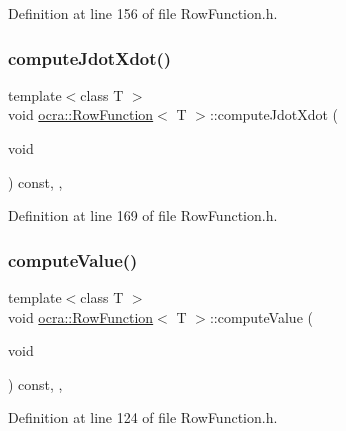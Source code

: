 Definition at line 156 of file Row\+Function.\+h.

\hypertarget{classocra_1_1RowFunction_a6e6009f89040ce403c6b1463dc82b29d}{}\label{classocra_1_1RowFunction_a6e6009f89040ce403c6b1463dc82b29d} 
\subsubsection{\texorpdfstring{compute\+Jdot\+Xdot()}{computeJdotXdot()}}
{\footnotesize\ttfamily template$<$class T $>$ \\
void \hyperlink{classocra_1_1RowFunction}{ocra\+::\+Row\+Function}$<$ T $>$\+::compute\+Jdot\+Xdot (\begin{DoxyParamCaption}\item[{void}]{ }\end{DoxyParamCaption}) const\hspace{0.3cm}{\ttfamily [inline]}, {\ttfamily [protected]}, {\ttfamily [virtual]}}



Definition at line 169 of file Row\+Function.\+h.

\hypertarget{classocra_1_1RowFunction_a99dfb80d85d71b217b49c9ef22dcd361}{}\label{classocra_1_1RowFunction_a99dfb80d85d71b217b49c9ef22dcd361} 
\subsubsection{\texorpdfstring{compute\+Value()}{computeValue()}}
{\footnotesize\ttfamily template$<$class T $>$ \\
void \hyperlink{classocra_1_1RowFunction}{ocra\+::\+Row\+Function}$<$ T $>$\+::compute\+Value (\begin{DoxyParamCaption}\item[{void}]{ }\end{DoxyParamCaption}) const\hspace{0.3cm}{\ttfamily [inline]}, {\ttfamily [protected]}, {\ttfamily [virtual]}}



Definition at line 124 of file Row\+Function.\+h.

\hypertarget{classocra_1_1RowFunction_ae2072d38459752174b456af8497da969}{}\label{classocra_1_1RowFunction_ae2072d38459752174b456af8497da969} 
